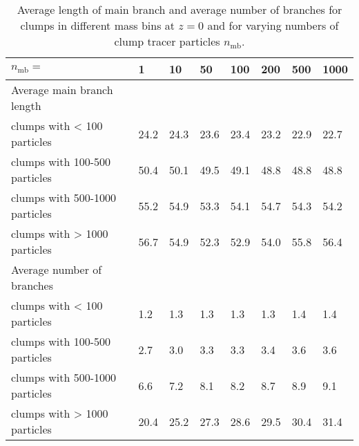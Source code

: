 \begin{table*}
  \caption{Average length of main branch and average number of
    branches for clumps in different mass bins at $z=0$ and for
    varying numbers of clump tracer particles $n_{\mathrm{mb}}$.}
  \label{tab:ntracers}

  {\small
    \begin{tabular}[c]{l | p{0.9cm} | p{0.9cm} | p{0.9cm} | p{0.9cm} | p{0.9cm} | p{0.9cm} | p{0.9cm} |}
      $n_{\mathrm{mb}}=$				&	1 		& 	10 		& 	50 		& 	100 	& 200 	&
500 		& 1000 \\
      \hline
      Average main branch length & & & & & & &\\
      clumps with < 100 particles		&	24.2	& 	24.3	& 	23.6	&	23.4 	& 23.2 	& 22.9 	& 22.7  \\
      clumps with 100-500 particles		&	50.4	& 	50.1	& 	49.5	&	49.1 	& 48.8 	& 48.8 	& 48.8  \\
      clumps with 500-1000 particles		&	55.2	& 	54.9	& 	53.3	&	54.1 	& 54.7 	& 54.3 	& 54.2  \\
      clumps with > 1000 particles		&	56.7	& 	54.9 	& 	52.3	&	52.9 	& 54.0 	& 55.8 	& 56.4  \\
      \hline
      Average number of branches & & & & & & &\\
      clumps with < 100 particles		&	1.2	& 	1.3	& 	1.3	&	1.3 	& 1.3  & 1.4 	& 1.4  \\
      clumps with 100-500 particles		&	2.7	& 	3.0	& 	3.3	&	3.3 	& 3.4  & 3.6 	& 3.6  \\
      clumps with 500-1000 particles		&	6.6	& 	7.2	& 	8.1	&	8.2 	& 8.7  & 8.9 	& 9.1  \\
      clumps with > 1000 particles		&	20.4& 	25.2& 	27.3&	28.6 	& 29.5 & 30.4 	& 31.4 \\
      \hline
    \end{tabular}
  }


\end{table*}
